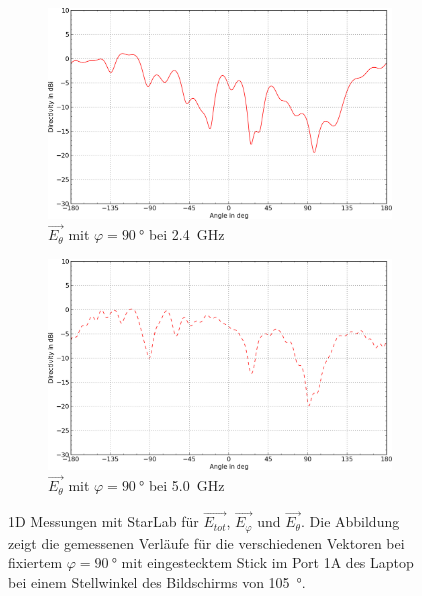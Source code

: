 \begin{figure}[h!]
	\begin{subfigure}[b]{0.48\textwidth}
		\includegraphics[width=1\textwidth]{../fig/plt/crazy_stuff_l4_pcb_v2c_laptop_1a_105_2ghz4_etheta_phi90-trim.png}
		\caption{$\vec{E_{\theta}}$ mit $\varphi=\SI{90}{\degree}$ bei \SI{2.4}{\giga\hertz}}
	\end{subfigure}
	\begin{subfigure}[b]{0.48\textwidth}
		\includegraphics[width=1\textwidth]{../fig/plt/crazy_stuff_l4_pcb_v2c_laptop_1a_105_5ghz0_etheta_phi90-trim.png}
		\caption{$\vec{E_{\theta}}$ mit $\varphi=\SI{90}{\degree}$ bei \SI{5.0}{\giga\hertz}}
	\end{subfigure}
	\caption[1D Simulationen mit Empite für $\vec{E_{tot}}$, $\vec{E_{\varphi}}$ und $\vec{E_{\theta}}$]{
		1D Messungen mit StarLab für $\vec{E_{tot}}$, $\vec{E_{\varphi}}$ und $\vec{E_{\theta}}$.
		Die Abbildung zeigt die gemessenen Verläufe für die
		verschiedenen Vektoren bei fixiertem
		$\varphi = \SI{90}{\degree}$ mit eingestecktem
		Stick im Port 1A des Laptop bei einem Stellwinkel
		des Bildschirms von \SI{105}{\degree}.}
\end{figure}

